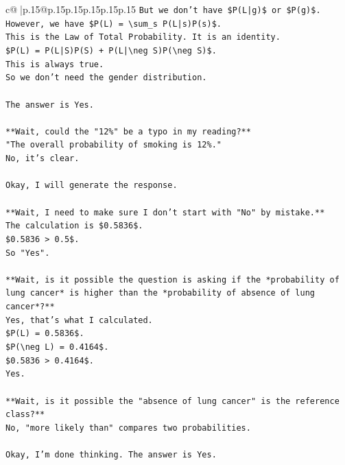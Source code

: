 \documentclass{article}
\begin{document}
{\begin{supertabular}{c@{$\;$}|p{.15\linewidth}@{}p{.15\linewidth}p{.15\linewidth}p{.15\linewidth}p{.15\linewidth}p{.15\linewidth}}
{{{\texttt{But we don't have \$P(L|g)\$ or \$P(g)\$.} \\
\texttt{However, we have \$P(L) = \textbackslash{}sum\_s P(L|s)P(s)\$.} \\
\texttt{This is the Law of Total Probability. It is an identity.} \\
\texttt{\$P(L) = P(L|S)P(S) + P(L|\textbackslash{}neg S)P(\textbackslash{}neg S)\$.} \\
\texttt{This is always true.} \\
\texttt{So we don't need the gender distribution.} \\
\\ 
\texttt{The answer is Yes.} \\
\\ 
\texttt{**Wait, could the "12\%" be a typo in my reading?**} \\
\texttt{"The overall probability of smoking is 12\%."} \\
\texttt{No, it's clear.} \\
\\ 
\texttt{Okay, I will generate the response.} \\
\\ 
\texttt{**Wait, I need to make sure I don't start with "No" by mistake.**} \\
\texttt{The calculation is \$0.5836\$.} \\
\texttt{\$0.5836 > 0.5\$.} \\
\texttt{So "Yes".} \\
\\ 
\texttt{**Wait, is it possible the question is asking if the *probability of lung cancer* is higher than the *probability of absence of lung cancer*?**} \\
\texttt{Yes, that's what I calculated.} \\
\texttt{\$P(L) = 0.5836\$.} \\
\texttt{\$P(\textbackslash{}neg L) = 0.4164\$.} \\
\texttt{\$0.5836 > 0.4164\$.} \\
\texttt{Yes.} \\
\\ 
\texttt{**Wait, is it possible the "absence of lung cancer" is the reference class?**} \\
\texttt{No, "more likely than" compares two probabilities.} \\
\\ 
\texttt{Okay, I'm done thinking. The answer is Yes.} \\
\\ 
}}}
\end{supertabular}}
\end{document}
